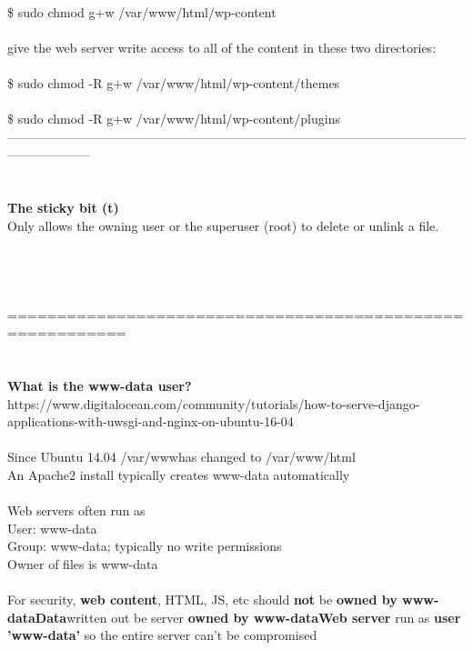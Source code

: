 \documentclass[10pt,a4paper]{article}
\begin{document}
{{{{{{{{{{{{{{{{{{{{\\
\$ sudo chmod g+w /var/www/html/wp-content}{\large \\
\\
give the web server write access to all of the content in these two directories:\\
\\
\$ sudo chmod -R g+w /var/www/html/wp-content/themes}{\large \\
\\
\$ sudo chmod -R g+w /var/www/html/wp-content/plugins}{\large \\
--------------------------------------------------------------------------------------------------------------------------------\\
\\
\\
\textbf{The sticky bit (t)}}{\large \\
Only allows the owning user or the superuser (root) to delete or unlink a file. \\
\\
\\
\\
\\
==========================================================\\
\\
\\
}\textbf{{\Large What is the www-data user?}}{\large }https://www.digitalocean.com/community/tutorials/how-to-serve-django-applications-with-uwsgi-and-nginx-on-ubuntu-16-04{\large \\
\\
Since Ubuntu 14.04 /var/www}{\large  has changed to /var/www/html}{\large  \\
An Apache2 install typically creates www-data automatically\\
\\
Web servers often run as \\
User: 			www-data\\
Group: 			www-data; typically no write permissions\\
Owner of files is 	www-data\\
\\
For security, \textbf{web content}}{\large , HTML, JS, etc should \textbf{not }}{\large be \textbf{owned by www-data}}{\large \textbf{Data}}{\large  written out be server \textbf{owned by www-data}}{\large \textbf{Web server }}{\large run as\textbf{ user 'www-data' }}{\large so the entire server can't be compromised\\
}}}}}}}}}}}}}}}}}}}}
\end{document}
